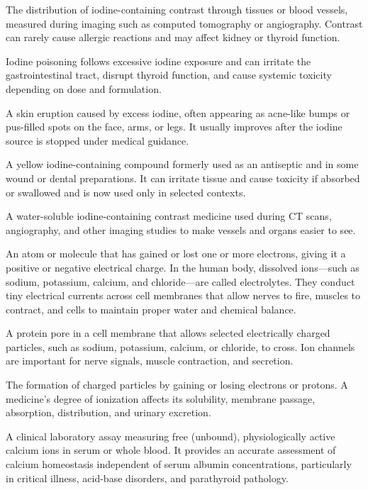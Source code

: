  The distribution of iodine-containing contrast through tissues or blood vessels, measured during imaging such as computed tomography or angiography. Contrast can rarely cause allergic reactions and may affect kidney or thyroid function.

 Iodine poisoning follows excessive iodine exposure and can irritate the gastrointestinal tract, disrupt thyroid function, and cause systemic toxicity depending on dose and formulation.

 A skin eruption caused by excess iodine, often appearing as acne-like bumps or pus-filled spots on the face, arms, or legs. It usually improves after the iodine source is stopped under medical guidance.

 A yellow iodine-containing compound formerly used as an antiseptic and in some wound or dental preparations. It can irritate tissue and cause toxicity if absorbed or swallowed and is now used only in selected contexts.

 A water-soluble iodine-containing contrast medicine used during CT scans, angiography, and other imaging studies to make vessels and organs easier to see.

 An atom or molecule that has gained or lost one or more electrons, giving it a positive or negative electrical charge. In the human body, dissolved ions---such as sodium, potassium, calcium, and chloride---are called electrolytes. They conduct tiny electrical currents across cell membranes that allow nerves to fire, muscles to contract, and cells to maintain proper water and chemical balance.

 A protein pore in a cell membrane that allows selected electrically charged particles, such as sodium, potassium, calcium, or chloride, to cross. Ion channels are important for nerve signals, muscle contraction, and secretion.

 The formation of charged particles by gaining or losing electrons or protons. A medicine's degree of ionization affects its solubility, membrane passage, absorption, distribution, and urinary excretion.

 A clinical laboratory assay measuring free (unbound), physiologically active calcium ions in serum or whole blood. It provides an accurate assessment of calcium homeostasis independent of serum albumin concentrations, particularly in critical illness, acid-base disorders, and parathyroid pathology.

